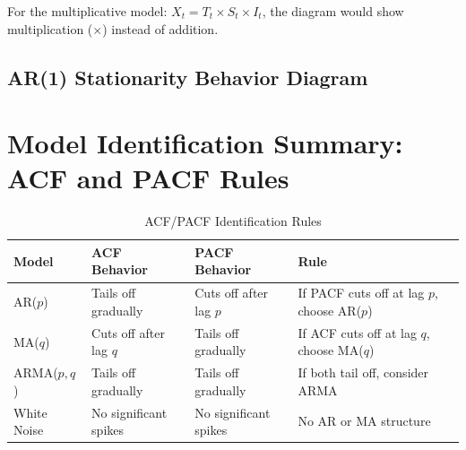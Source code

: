 \documentclass[11pt,a4paper]{article}
\begin{document}
For the multiplicative model: $X_t = T_t \times S_t \times I_t$, the diagram would show multiplication ($\times$) instead of addition.

\subsection{AR(1) Stationarity Behavior Diagram}

\begin{center}
\end{center}

\section{Model Identification Summary: ACF and PACF Rules}

\begin{table}[H]
\centering
\begin{tabular}{|l|l|l|l|}
\hline
\textbf{Model} & \textbf{ACF Behavior} & \textbf{PACF Behavior} & \textbf{Rule} \\
\hline
AR($p$) & Tails off gradually & Cuts off after lag $p$ & If PACF cuts off at lag $p$, choose AR($p$) \\
MA($q$) & Cuts off after lag $q$ & Tails off gradually & If ACF cuts off at lag $q$, choose MA($q$) \\
ARMA($p,q$) & Tails off gradually & Tails off gradually & If both tail off, consider ARMA \\
White Noise & No significant spikes & No significant spikes & No AR or MA structure \\
\hline
\end{tabular}
\caption{ACF/PACF Identification Rules}
\end{table}
\end{document}
